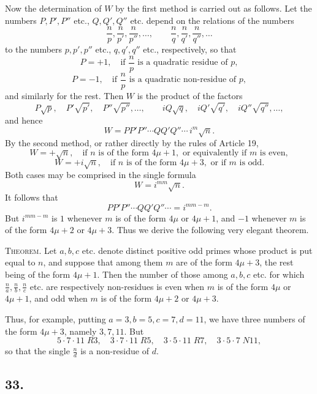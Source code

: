 \documentclass[12pt]{article}
\begin{document}
Now the determination of $W$ by the first method is carried out as follows. Let the numbers $P,P',P''$ etc., $Q,Q',Q''$ etc. depend on the relations of the numbers
\[
\frac{n}{p},\frac{n}{p'},\frac{n}{p''},\ldots,\qquad
\frac{n}{q},\frac{n}{q'},\frac{n}{q''},\ldots
\]
to the numbers $p,p',p''$ etc., $q,q',q''$ etc., respectively, so that
\[
P=+1,\quad\text{if }\frac{n}{p}\text{ is a quadratic residue of }p,
\]
\[
P=-1,\quad\text{if }\frac{n}{p}\text{ is a quadratic non-residue of }p,
\]
and similarly for the rest. Then $W$ is the product of the factors
\[
P\sqrt p,\quad P'\sqrt{p'},\quad P''\sqrt{p''},\ldots,\qquad
iQ\sqrt q,\quad iQ'\sqrt{q'},\quad iQ''\sqrt{q''},\ldots,
\]
and hence
\[
W=PP'P''\cdots QQ'Q''\cdots\, i^m\sqrt n.
\]
By the second method, or rather directly by the rules of Article 19,
\[
W=+\sqrt n,\quad\text{if }n\text{ is of the form }4\mu+1,\text{ or equivalently if }m\text{ is even},
\]
\[
W=+i\sqrt n,\quad\text{if }n\text{ is of the form }4\mu+3,\text{ or if }m\text{ is odd}.
\]
Both cases may be comprised in the single formula
\[
W=i^{mm}\sqrt n.
\]
It follows that
\[
PP'P''\cdots QQ'Q''\cdots=i^{mm-m}.
\]
But $i^{mm-m}$ is $1$ whenever $m$ is of the form $4\mu$ or $4\mu+1$, and $-1$ whenever $m$ is of the form $4\mu+2$ or $4\mu+3$. Thus we derive the following very elegant theorem.

\textsc{Theorem.} Let $a,b,c$ etc. denote distinct positive odd primes whose product is put equal to $n$, and suppose that among them $m$ are of the form $4\mu+3$, the rest being of the form $4\mu+1$. Then the number of those among $a,b,c$ etc. for which $\frac{n}{a},\frac{n}{b},\frac{n}{c}$ etc. are respectively non-residues is even when $m$ is of the form $4\mu$ or $4\mu+1$, and odd when $m$ is of the form $4\mu+2$ or $4\mu+3$.

Thus, for example, putting $a=3,b=5,c=7,d=11$, we have three numbers of the form $4\mu+3$, namely $3,7,11$. But
\[
5\cdot7\cdot11\;R3,\quad
3\cdot7\cdot11\;R5,\quad
3\cdot5\cdot11\;R7,\quad
3\cdot5\cdot7\;N11,
\]
so that the single $\frac{n}{d}$ is a non-residue of $d$.

\subsection*{33.}
\end{document}
